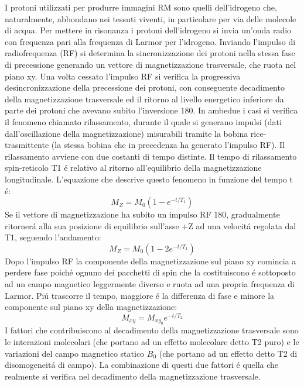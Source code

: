 \documentclass[a4paper,12pt]{report}
\begin{document}
 I protoni utilizzati per produrre immagini RM sono quelli dell'idrogeno che, naturalmente, abbondano nei tessuti viventi, in particolare per via delle molecole di acqua.
 Per mettere in risonanza i protoni dell'idrogeno si invia un'onda radio con frequenza pari alla frequenza di Larmor per l'idrogeno.
 Inviando l'impulso di radiofrequenza (RF) si determina la sincronizzazione dei protoni nella stessa fase di precessione generando un vettore di magnetizzazione trasversale, che ruota nel piano xy.
 Una volta cessato l'impulso RF si verifica la progressiva desincronizzazione della precessione dei protoni, con conseguente decadimento della magnetizzazione trasversale ed il ritorno al livello energetico inferiore da parte dei protoni che avevano subito l'inversione 180.
 In ambedue i casi si verifica il fenomeno chiamato rilassamento, durante il quale si generano impulsi (dati dall'oscillazione della magnetizzazione) misurabili tramite la bobina rice-trasmittente (la stessa bobina che in precedenza ha generato l'impulso RF).
 Il rilassamento avviene con due costanti di tempo distinte.
 Il tempo di rilassamento spin-reticolo T1 \'e relativo al ritorno all'equilibrio della magnetizzazione longitudinale. 
 L'equazione che descrive questo fenomeno in funzione del tempo t \'e:
 \begin{equation}
  M_Z = M_0 ( 1 - e^{-t/T_1} )
 \end{equation}
 Se il vettore di magnetizzazione ha subito un impulso RF 180, gradualmente ritorner\'a alla sua posizione di equilibrio sull'asse +Z ad una velocit\'a regolata dal T1, seguendo l'andamento:
 \begin{equation}
  M_Z = M_0 ( 1 - 2e^{-t/T_1} )
 \end{equation}
 Dopo l'impulso RF la componente della magnetizzazione sul piano xy comincia a perdere fase poich\'e ognuno dei pacchetti di spin che la costituiscono \'e sottoposto ad un campo magnetico leggermente diverso e ruota ad una propria frequenza di Larmor. 
 Pi\'u trascorre il tempo, maggiore \'e la differenza di fase e minore la componente sul piano xy della magnetizzazione:
 \begin{equation}
  M_{xy} = M_{xy_0} e^{-t/T_2}
 \end{equation}
 I fattori che contribuiscono al decadimento della magnetizzazione trasversale sono le interazioni molecolari (che portano ad un effetto molecolare detto T2 puro) e le variazioni del campo magnetico statico $B_0$ (che portano ad un effetto detto T2 di disomogeneit\'a di campo).
 La combinazione di questi due fattori \'e quella che realmente si verifica nel decadimento della magnetizzazione trasversale.
 
\end{document}
